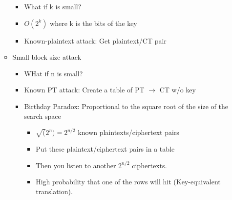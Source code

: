 \begin{itemize}
\begin{itemize}
        \begin{itemize}
        \item What if k is small?
        \item $O(2^k)$ where k is the bits of the key
        \item Known-plaintext attack: Get plaintext/CT pair
        \end{itemize}
    \item Small block size attack
        \begin{itemize}
        \item WHat if n is small?
        \item Known PT attack: Create a table of PT $\rightarrow$ CT w/o key
        \item Birthday Paradox: Proportional to the square root of the size of the search space
            \begin{itemize}
            \item $\sqrt(2^n) = 2^{n/2}$ known plaintexts/ciphertext pairs
            \item Put these plaintext/ciphertext pairs in a table
            \item Then you listen to another $2^{n/2}$ ciphertexts.
            \item High probability that one of the rows will hit (Key-equivalent translation).
            \end{itemize}
        \end{itemize}
    \end{itemize}
\end{itemize}